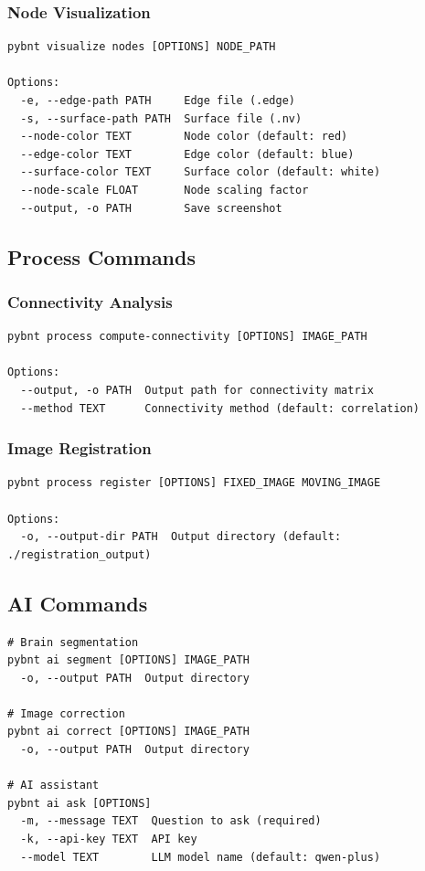 \documentclass[11pt,a4paper]{article}
\begin{document}
\subsubsection{Node Visualization}

\begin{lstlisting}[caption=pybnt visualize nodes]
pybnt visualize nodes [OPTIONS] NODE_PATH

Options:
  -e, --edge-path PATH     Edge file (.edge)
  -s, --surface-path PATH  Surface file (.nv)
  --node-color TEXT        Node color (default: red)
  --edge-color TEXT        Edge color (default: blue)
  --surface-color TEXT     Surface color (default: white)
  --node-scale FLOAT       Node scaling factor
  --output, -o PATH        Save screenshot
\end{lstlisting}

\subsection{Process Commands}

\subsubsection{Connectivity Analysis}

\begin{lstlisting}[caption=pybnt process compute-connectivity]
pybnt process compute-connectivity [OPTIONS] IMAGE_PATH

Options:
  --output, -o PATH  Output path for connectivity matrix
  --method TEXT      Connectivity method (default: correlation)
\end{lstlisting}

\subsubsection{Image Registration}

\begin{lstlisting}[caption=pybnt process register]
pybnt process register [OPTIONS] FIXED_IMAGE MOVING_IMAGE

Options:
  -o, --output-dir PATH  Output directory (default: ./registration_output)
\end{lstlisting}

\subsection{AI Commands}

\begin{lstlisting}[caption=pybnt ai commands]
# Brain segmentation
pybnt ai segment [OPTIONS] IMAGE_PATH
  -o, --output PATH  Output directory

# Image correction
pybnt ai correct [OPTIONS] IMAGE_PATH
  -o, --output PATH  Output directory

# AI assistant
pybnt ai ask [OPTIONS]
  -m, --message TEXT  Question to ask (required)
  -k, --api-key TEXT  API key
  --model TEXT        LLM model name (default: qwen-plus)
\end{lstlisting}
\end{document}

